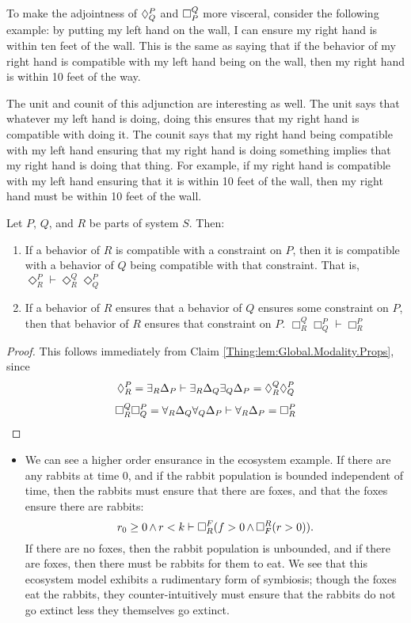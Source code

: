  To make the adjointness of $\compat{P}{Q}$ and $\ensure{Q}{P}$ more visceral, consider the following example: by putting my left hand on the wall, I can ensure my right hand is within ten feet of the wall. This is the same as saying that if the behavior of my right hand is compatible with my left hand being on the wall, then my right hand is within 10 feet of the way.
    
    The unit and counit of this adjunction are interesting as well. The unit says that whatever my left hand is doing, doing this ensures that my right hand is compatible with doing it. The counit says that my right hand being compatible with my left hand ensuring that my right hand is doing something implies that my right hand is doing that thing. For example, if my right hand is compatible with my left hand ensuring that it is within 10 feet of the wall, then my right hand must be within 10 feet of the wall.
    \begin{claim}
    Let $P$, $Q$, and $R$ be parts of system $S$. Then:
    \begin{enumerate}
        \item If a behavior of $R$ is compatible with a constraint on $P$, then it is compatible with a behavior of $Q$ being compatible with that constraint. That is, $\Diamond^P_R \vdash \Diamond^Q_R  \Diamond^P_Q$
        \item If a behavior of $R$ ensures that a behavior of $Q$ ensures some constraint on $P$, then that behavior of $R$ ensures that constraint on $P$. $\Box^Q_R\Box^P_Q \vdash \Box_R^P$
    \end{enumerate}
    \end{claim}
    \begin{proof}
    This follows immediately from Claim \ref{Thing:lem:Global.Modality.Props}, since 
    $$\compat{P}{R} = \exists_R \Delta_P \vdash \exists_R \Delta_Q \exists_Q \Delta_P = \compat{Q}{R}\compat{P}{Q}$$
    $$\ensure{Q}{R}\ensure{P}{Q} = \forall_R \Delta_Q \forall_Q \Delta_P \vdash \forall_R \Delta_P = \ensure{P}{R}$$
    \end{proof}
    
\begin{ex}
\begin{itemize}
    \item We can see a higher order ensurance in the ecosystem example. If there are any rabbits at time $0$, and if the rabbit population is bounded independent of time, then the rabbits must ensure that there are foxes, and that the foxes ensure there are rabbits:
    $$r_0 \geq 0 \meet r < k \vdash \ensure{F}{R} (f > 0 \meet \ensure{R}{F}(r > 0)).$$ 
    If there are no foxes, then the rabbit population is unbounded, and if there are foxes, then there must be rabbits for them to eat. We see that this ecosystem model exhibits a rudimentary form of symbiosis; though the foxes eat the rabbits, they counter-intuitively must ensure that the rabbits do not go extinct less they themselves go extinct.
\end{itemize}
\end{ex}
 
